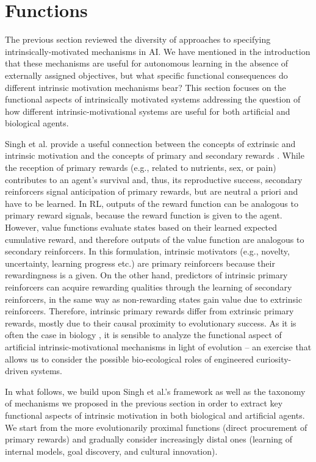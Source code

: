 \section{Functions}\label{CH3_S_functions}
The previous section reviewed the diversity of approaches to specifying intrinsically-motivated mechanisms in AI. We have mentioned in the introduction that these mechanisms are useful for autonomous learning in the absence of externally assigned objectives, but what specific functional consequences do different intrinsic motivation mechanisms bear? This section focuses on the functional aspects of intrinsically motivated systems addressing the question of how different intrinsic-motivational systems are useful for both artificial and biological agents.  

Singh et al. provide a useful connection between the concepts of extrinsic and intrinsic motivation and the concepts of primary and secondary rewards \parencite{singh_intrinsically_2010}. While the reception of primary rewards (e.g., related to nutrients, sex, or pain) contributes to an agent’s survival and, thus, its reproductive success, secondary reinforcers signal anticipation of primary rewards, but are neutral a priori and have to be learned. In RL, outputs of the reward function can be analogous to primary reward signals, because the reward function is given to the agent. However, value functions evaluate states based on their learned expected cumulative reward, and therefore outputs of the value function are analogous to secondary reinforcers. In this formulation, intrinsic motivators (e.g., novelty, uncertainty, learning progress etc.) are primary reinforcers because their rewardingness is a given. On the other hand, predictors of intrinsic primary reinforcers can acquire rewarding qualities through the learning of secondary reinforcers, in the same way as non-rewarding states gain value due to extrinsic reinforcers. Therefore, intrinsic primary rewards differ from extrinsic primary rewards, mostly due to their causal proximity to evolutionary success. As it is often the case in biology \parencite{dobzhansky_nothing_1973}, it is sensible to analyze the functional aspect of artificial intrinsic-motivational mechanisms in light of evolution -- an exercise that allows us to consider the possible bio-ecological roles of engineered curiosity-driven systems.

In what follows, we build upon Singh et al.’s framework as well as the taxonomy of mechanisms we proposed in the previous section in order to extract key functional aspects of intrinsic motivation in both biological and artificial agents. We start from the more evolutionarily proximal functions (direct procurement of primary rewards) and gradually consider increasingly distal ones (learning of internal models, goal discovery, and cultural innovation).

